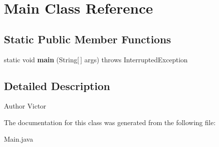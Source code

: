 \hypertarget{classMain}{}\section{Main Class Reference}
\label{classMain}
\subsection*{Static Public Member Functions}
\begin{DoxyCompactItemize}
\item 
\mbox{\label{classMain_a8a5d0f827edddff706cc0e6740d0579a}} 
static void {\bfseries main} (String\mbox{[}$\,$\mbox{]} args)  throws Interrupted\+Exception 
\end{DoxyCompactItemize}


\subsection{Detailed Description}
\begin{DoxyAuthor}{Author}
Victor 
\end{DoxyAuthor}


The documentation for this class was generated from the following file\+:\begin{DoxyCompactItemize}
\item 
Main.\+java\end{DoxyCompactItemize}
